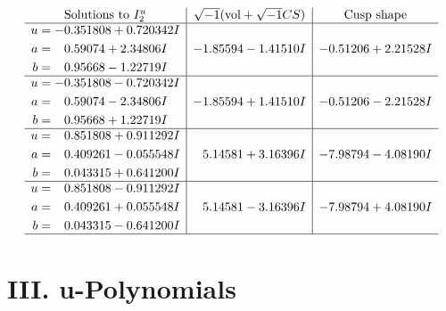 \documentclass[1p]{elsarticle_modified}
\theoremstyle{definition}
\newcommand{\I}{\sqrt{-1}}
\begin{document}
$$\begin{array}{c|c|c}  
\text{Solutions to }I^u_{2}& \I (\text{vol} + \sqrt{-1}CS) & \text{Cusp shape}\\
 \hline 
\begin{aligned}
u &= -0.351808 + 0.720342 I \\
a &= \phantom{-}0.59074 + 2.34806 I \\
b &= \phantom{-}0.95668 - 1.22719 I\end{aligned}
 & -1.85594 - 1.41510 I & -0.51206 + 2.21528 I \\ \hline\begin{aligned}
u &= -0.351808 - 0.720342 I \\
a &= \phantom{-}0.59074 - 2.34806 I \\
b &= \phantom{-}0.95668 + 1.22719 I\end{aligned}
 & -1.85594 + 1.41510 I & -0.51206 - 2.21528 I \\ \hline\begin{aligned}
u &= \phantom{-}0.851808 + 0.911292 I \\
a &= \phantom{-}0.409261 - 0.055548 I \\
b &= \phantom{-}0.043315 + 0.641200 I\end{aligned}
 & \phantom{-}5.14581 + 3.16396 I & -7.98794 - 4.08190 I \\ \hline\begin{aligned}
u &= \phantom{-}0.851808 - 0.911292 I \\
a &= \phantom{-}0.409261 + 0.055548 I \\
b &= \phantom{-}0.043315 - 0.641200 I\end{aligned}
 & \phantom{-}5.14581 - 3.16396 I & -7.98794 + 4.08190 I\\
 \hline 
 \end{array}$$\newpage
\newpage\renewcommand{\arraystretch}{1}
\centering \section*{ III. u-Polynomials}
\end{document}
